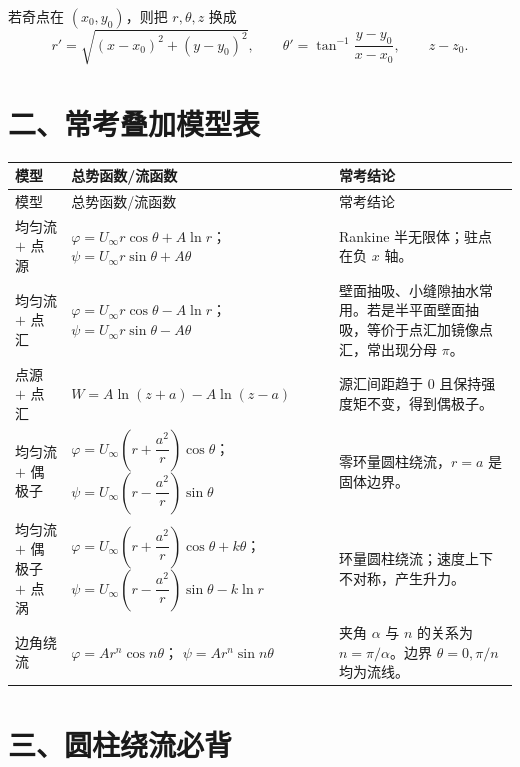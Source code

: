 \documentclass[10.5pt,a4paper]{ctexart}
\begin{document}
\begin{tcolorbox}[colback=yellow!5,colframe=orange!70!black,title=奇点不在原点时]
若奇点在 $(x_0,y_0)$，则把 $r,\theta,z$ 换成
\[
r'=\sqrt{(x-x_0)^2+(y-y_0)^2},\qquad
\theta'=\tan^{-1}\frac{y-y_0}{x-x_0},\qquad
z-z_0.
\]
\end{tcolorbox}

\section*{二、常考叠加模型表}

\small
\begin{longtable}{>{\raggedright\arraybackslash}p{3.4cm}
>{\centering\arraybackslash}p{7.2cm}
>{\raggedright\arraybackslash}p{6.6cm}}
\toprule
模型 & 总势函数/流函数 & 常考结论\\
\midrule
\endfirsthead
\toprule
模型 & 总势函数/流函数 & 常考结论\\
\midrule
\endhead

均匀流 $+$ 点源
&
$\varphi=U_\infty r\cos\theta+A\ln r$；
$\psi=U_\infty r\sin\theta+A\theta$
& Rankine 半无限体；驻点在负 $x$ 轴。\\

均匀流 $+$ 点汇
&
$\varphi=U_\infty r\cos\theta-A\ln r$；
$\psi=U_\infty r\sin\theta-A\theta$
& 壁面抽吸、小缝隙抽水常用。若是半平面壁面抽吸，等价于点汇加镜像点汇，常出现分母 $\pi$。\\

点源 $+$ 点汇
&
$W=A\ln(z+a)-A\ln(z-a)$
& 源汇间距趋于 $0$ 且保持强度矩不变，得到偶极子。\\

均匀流 $+$ 偶极子
&
$\varphi=U_\infty\left(r+\dfrac{a^2}{r}\right)\cos\theta$；
$\psi=U_\infty\left(r-\dfrac{a^2}{r}\right)\sin\theta$
& 零环量圆柱绕流，$r=a$ 是固体边界。\\

均匀流 $+$ 偶极子 $+$ 点涡
&
$\varphi=U_\infty\left(r+\dfrac{a^2}{r}\right)\cos\theta+k\theta$；
$\psi=U_\infty\left(r-\dfrac{a^2}{r}\right)\sin\theta-k\ln r$
& 环量圆柱绕流；速度上下不对称，产生升力。\\

边角绕流
&
$\varphi=A r^n\cos n\theta$；
$\psi=A r^n\sin n\theta$
& 夹角 $\alpha$ 与 $n$ 的关系为 $n=\pi/\alpha$。边界 $\theta=0,\pi/n$ 均为流线。\\
\bottomrule
\end{longtable}
\normalsize

\section*{三、圆柱绕流必背}
\end{document}
